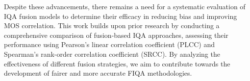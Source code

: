 Despite these advancements, there remains a need for a systematic evaluation of IQA fusion models to determine their efficacy in reducing bias and improving MOS correlation. This work builds upon prior research by conducting a comprehensive comparison of fusion-based IQA approaches, assessing their performance using Pearson's linear correlation coefficient (PLCC) and Spearman's rank-order correlation coefficient (SRCC). By analyzing the effectiveness of different fusion strategies, we aim to contribute towards the development of fairer and more accurate FIQA methodologies.
